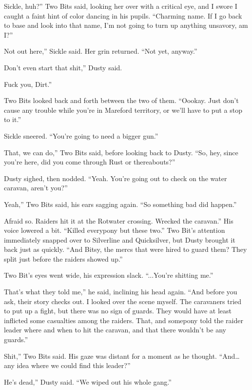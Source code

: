 \leavevmode{}Sickle, huh?” Two Bits said, looking her over with a critical eye, and I swore I caught a faint hint of color dancing in his pupils. “Charming name. If I go back to base and look into that name, I’m not going to turn up anything unsavory, am I?”

\leavevmode{}Not out here,” Sickle said. Her grin returned. “Not yet, anyway.”

\leavevmode{}Don’t even start that shit,” Dusty said.

\leavevmode{}Fuck you, Dirt.”

Two Bits looked back and forth between the two of them. “Oookay. Just don’t cause any trouble while you’re in Mareford territory, or we’ll have to put a stop to it.”

Sickle sneered. “You’re going to need a bigger gun.”

\leavevmode{}That, we can do,” Two Bits said, before looking back to Dusty. “So, hey, since you’re here, did you come through Rust or thereabouts?”

Dusty sighed, then nodded. “Yeah. You’re going out to check on the water caravan, aren’t you?”

\leavevmode{}Yeah,” Two Bits said, his ears sagging again. “So something bad did happen.”

\leavevmode{}Afraid so. Raiders hit it at the Rotwater crossing. Wrecked the caravan.” His voice lowered a bit. “Killed everypony but these two.” Two Bit’s attention immediately snapped over to Silverline and Quicksilver, but Dusty brought it back just as quickly. “And Bitsy, the mercs that were hired to guard them? They split just before the raiders showed up.”

Two Bit’s eyes went wide, his expression slack. “...You’re shitting me.”

\leavevmode{}That’s what they told me,” he said, inclining his head again. “And before you ask, their story checks out. I looked over the scene myself. The caravaners tried to put up a fight, but there was no sign of guards. They would have at least inflicted some casualties among the raiders. That, and somepony told the raider leader where and when to hit the caravan, and that there wouldn’t be any guards.”

\leavevmode{}Shit,” Two Bits said. His gaze was distant for a moment as he thought. “And… any idea where we could find this leader?”

\leavevmode{}He’s dead,” Dusty said. “We wiped out his whole gang.”

